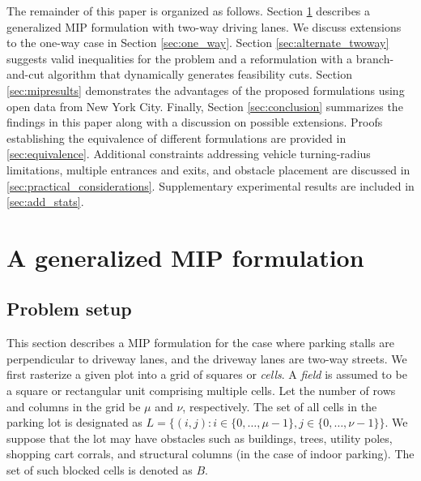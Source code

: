 \documentclass[10pt]{article}
\newcommand{\lotset}{L}
\newcommand{\blockedset}{B}
\newcommand{\numrows}{\mu}
\newcommand{\numcols}{\nu}
\theoremstyle{definition}
\begin{document}
The remainder of this paper is organized as follows. Section \ref{sec:MIP} describes a generalized MIP formulation with two-way driving lanes. We discuss extensions to the one-way case in Section \ref{sec:one_way}. Section \ref{sec:alternate_twoway} suggests valid inequalities for the problem and a reformulation with a branch-and-cut algorithm that dynamically generates feasibility cuts. Section \ref{sec:mipresults} demonstrates the advantages of the proposed formulations using open data from New York City. Finally, Section \ref{sec:conclusion} summarizes the findings in this paper along with a discussion on possible extensions. Proofs establishing the equivalence of different formulations are provided in \ref{sec:equivalence}. Additional constraints addressing vehicle turning-radius limitations, multiple entrances and exits, and obstacle placement are discussed in  \ref{sec:practical_considerations}. Supplementary experimental results are included in \ref{sec:add_stats}.




\section{A generalized MIP formulation}
\label{sec:MIP}

\subsection{Problem setup}
\label{sec:perp problem setup}
This section describes a MIP formulation for the case where parking stalls are perpendicular to driveway lanes, and the driveway lanes are two-way streets. We first rasterize a given plot into a grid of squares or \textit{cells}. A \textit{field} is assumed to be a square or rectangular unit comprising multiple cells. Let the number of rows and columns in the grid be $\numrows$ and $\numcols$, respectively. The set of all cells in the parking lot is designated as $\lotset =\{(i,j): i \in \{0,\hdots,\numrows-1\}, j \in \{0,\hdots,\numcols-1\} \}$. We suppose that the lot may have obstacles such as buildings, trees, utility poles, shopping cart corrals, and structural columns (in the case of indoor parking). The set of such blocked cells is denoted as $\blockedset$. 
\end{document}
